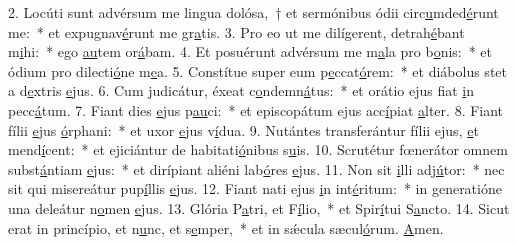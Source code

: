 2. Locúti sunt advérsum me lingua dolósa,~† et sermónibus ódii circ\uline{u}mded\uline{é}runt me:~* et expugnav\uline{é}runt me gr\uline{a}tis.
3. Pro eo ut me dilígerent, detrah\uline{é}bant m\uline{i}hi:~* ego \uline{au}tem or\uline{á}bam.
4. Et posuérunt advérsum me m\uline{a}la pro b\uline{o}nis:~* et ódium pro dilecti\uline{ó}ne m\uline{e}a.
5. Constítue super eum p\uline{e}ccat\uline{ó}rem:~* et diábolus stet a d\uline{e}xtris \uline{e}jus.
6. Cum judicátur, éxeat c\uline{o}ndemn\uline{á}tus:~* et orátio ejus fiat \uline{i}n pecc\uline{á}tum.
7. Fiant dies \uline{e}jus p\uline{au}ci:~* et episcopátum ejus acc\uline{í}piat \uline{a}lter.
8. Fiant fílii \uline{e}jus \uline{ó}rphani:~* et uxor \uline{e}jus v\uline{í}dua.
9. Nutántes transferántur fílii ejus, \uline{e}t mend\uline{í}cent:~* et ejiciántur de habitati\uline{ó}nibus s\uline{u}is.
10. Scrutétur fœnerátor omnem subst\uline{á}ntiam \uline{e}jus:~* et dirípiant aliéni lab\uline{ó}res \uline{e}jus.
11. Non sit \uline{i}lli adj\uline{ú}tor:~* nec sit qui misereátur pup\uline{í}llis \uline{e}jus.
12. Fiant nati ejus \uline{i}n int\uline{é}ritum:~* in generatióne una deleátur n\uline{o}men \uline{e}jus.
13. Glória P\uline{a}tri, et F\uline{í}lio,~* et Spir\uline{í}tui S\uline{a}ncto.
14. Sicut erat in princípio, et n\uline{u}nc, et s\uline{e}mper,~* et in sǽcula sæcul\uline{ó}rum. \uline{A}men.
